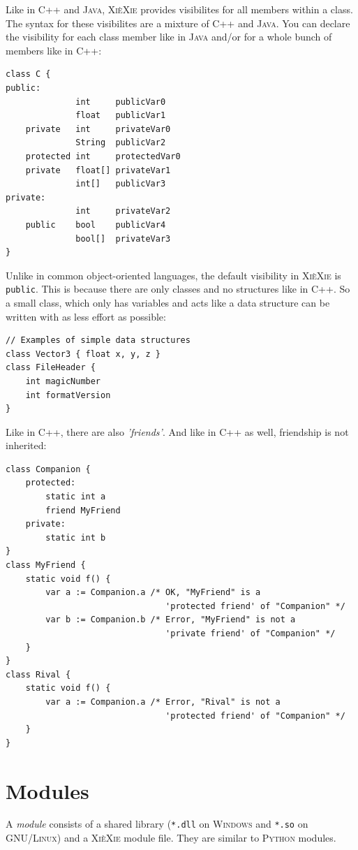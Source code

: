 \documentclass[a5paper]{report}
\def\xiexie{\textsc{Xi\`eXie}\xspace}
\def\cpp{\textsc{C++}\xspace}
\def\java{\textsc{Java}\xspace}
\def\python{\textsc{Python}\xspace}
\def\windows{\textsc{Windows}\xspace}
\def\linux{\textsc{GNU/Linux}\xspace}
\begin{document}
Like in \cpp and \java, \xiexie provides visibilites for all members within a class. The syntax for these visibilites
are a mixture of \cpp and \java. You can declare the visibility for each class member like in \java and/or for a
whole bunch of members like in \cpp:
\begin{lstlisting}
class C {
public:
              int     publicVar0
              float   publicVar1
    private   int     privateVar0
              String  publicVar2
    protected int     protectedVar0
    private   float[] privateVar1
              int[]   publicVar3
private:
              int     privateVar2
    public    bool    publicVar4
              bool[]  privateVar3
}
\end{lstlisting}
Unlike in common object-oriented languages, the default visibility in \xiexie is \texttt{public}.
This is because there are only classes and no structures like in \cpp. So a small class, which only has variables and
acts like a data structure can be written with as less effort as possible:
\begin{lstlisting}
// Examples of simple data structures
class Vector3 { float x, y, z }
class FileHeader {
    int magicNumber
    int formatVersion
}
\end{lstlisting}
Like in \cpp, there are also \textit{'friends'}. And like in \cpp as well, friendship is not inherited:
\begin{lstlisting}
class Companion {
    protected:
        static int a
        friend MyFriend
    private:
        static int b
}
class MyFriend {
    static void f() {
        var a := Companion.a /* OK, "MyFriend" is a
                                'protected friend' of "Companion" */
        var b := Companion.b /* Error, "MyFriend" is not a
                                'private friend' of "Companion" */
    }
}
class Rival {
    static void f() {
        var a := Companion.a /* Error, "Rival" is not a
                                'protected friend' of "Companion" */
    }
}
\end{lstlisting}



\chapter{Modules}
\label{ch:modules}

A \textit{module} consists of a shared library (\texttt{*.dll} on \windows and \texttt{*.so} on \linux)
and a \xiexie module file. They are similar to \python modules.
\end{document}
